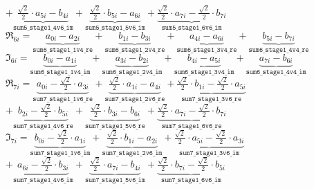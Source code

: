 \vspace{0.4cm}
\hspace{0.3cm}$ + \underbrace{\frac{\sqrt{2}}{2} \cdot a_{5i} -b_{4i}}_{\texttt{sum5\_stage1\_4v6\_im}} + \underbrace{\frac{\sqrt{2}}{2} \cdot b_{5i} -a_{6i}}_{\texttt{sum5\_stage1\_5v6\_im}} + \underbrace{\frac{\sqrt{2}}{2} \cdot a_{7i} -\frac{\sqrt{2}}{2} \cdot b_{7i}}_{\texttt{sum5\_stage1\_6v6\_im}}$\\

\vspace{1cm}
\noindent$ \Re_{6i} = \underbrace{a_{0i} -a_{2i}}_{\texttt{sum6\_stage1\_1v4\_re}} + \underbrace{b_{1i} -b_{3i}}_{\texttt{sum6\_stage1\_2v4\_re}} + \underbrace{a_{4i} -a_{6i}}_{\texttt{sum6\_stage1\_3v4\_re}} + \underbrace{b_{5i} -b_{7i}}_{\texttt{sum6\_stage1\_4v4\_re}}$\\

\vspace{0.5cm}
\noindent$ \Im_{6i} = \underbrace{b_{0i} -a_{1i}}_{\texttt{sum6\_stage1\_1v4\_im}} + \underbrace{a_{3i} -b_{2i}}_{\texttt{sum6\_stage1\_2v4\_im}} + \underbrace{b_{4i} -a_{5i}}_{\texttt{sum6\_stage1\_3v4\_im}} + \underbrace{a_{7i} -b_{6i}}_{\texttt{sum6\_stage1\_4v4\_im}}$\\

\vspace{1cm}
\noindent$\Re_{7i} = \underbrace{a_{0i} -\frac{\sqrt{2}}{2} \cdot a_{3i}}_{\texttt{sum7\_stage1\_1v6\_re}} + \underbrace{\frac{\sqrt{2}}{2} \cdot a_{1i} -a_{4i}}_{\texttt{sum7\_stage1\_2v6\_re}} + \underbrace{\frac{\sqrt{2}}{2} \cdot b_{1i} -\frac{\sqrt{2}}{2} \cdot a_{5i}}_{\texttt{sum7\_stage1\_3v6\_re}}$\\

\vspace{0.4cm}
\hspace{0.3cm}$ + \underbrace{b_{2i} -\frac{\sqrt{2}}{2} \cdot b_{5i}}_{\texttt{sum7\_stage1\_4v6\_re}} + \underbrace{\frac{\sqrt{2}}{2} \cdot b_{3i} -b_{6i}}_{\texttt{sum7\_stage1\_5v6\_re}} + \underbrace{\frac{\sqrt{2}}{2} \cdot a_{7i} -\frac{\sqrt{2}}{2} \cdot b_{7i}}_{\texttt{sum7\_stage1\_6v6\_re}}$\\

\vspace{0.5cm}
\noindent$\Im_{7i} = \underbrace{b_{0i} - \frac{\sqrt{2}}{2} \cdot a_{1i}}_{\texttt{sum7\_stage1\_1v6\_im}} + \underbrace{\frac{\sqrt{2}}{2} \cdot b_{1i} -a_{2i}}_{\texttt{sum7\_stage1\_2v6\_im}} + \underbrace{\frac{\sqrt{2}}{2} \cdot a_{5i} -\frac{\sqrt{2}}{2} \cdot a_{3i}}_{\texttt{sum7\_stage1\_3v6\_im}}$\\

\vspace{0.4cm}
\hspace{0.3cm}$ + \underbrace{a_{6i} -\frac{\sqrt{2}}{2} \cdot b_{3i}}_{\texttt{sum7\_stage1\_4v6\_im}} + \underbrace{\frac{\sqrt{2}}{2} \cdot a_{7i} -b_{4i}}_{\texttt{sum7\_stage1\_5v6\_im}} + \underbrace{\frac{\sqrt{2}}{2} \cdot b_{7i} -\frac{\sqrt{2}}{2} \cdot b_{5i}}_{\texttt{sum7\_stage1\_6v6\_im}}$\\
